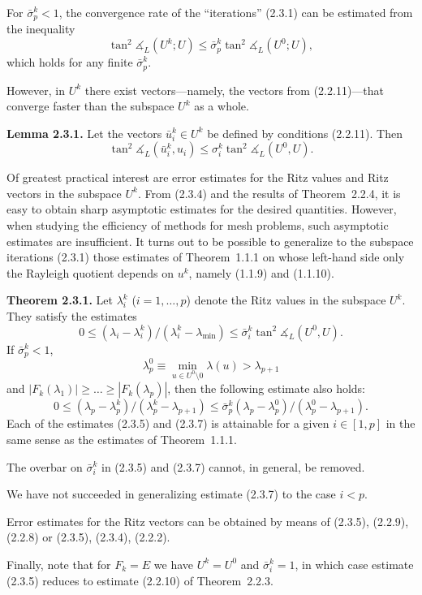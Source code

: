 \documentclass[11pt,oneside]{book}
\newcommand{\ang}{\measuredangle}
\begin{document}
For $\bar{\sigma}_p^k < 1$, the convergence rate of the ``iterations'' (2.3.1) can be estimated from the inequality
\[
\tan^2 \ang_L(U^k; U) \leqslant \bar{\sigma}_p^k \tan^2 \ang_L(U^0; U), \tag{2.3.3}
\]
which holds for any finite $\bar{\sigma}_p^k$.

However, in $U^k$ there exist vectors---namely, the vectors from (2.2.11)---that converge faster than the subspace $U^k$ as a whole.

\textbf{Lemma 2.3.1.} Let the vectors $\bar{u}_i^k \in U^k$ be defined by conditions (2.2.11). Then
\[
\tan^2 \ang_L(\bar{u}_i^k, u_i) \leqslant \sigma_i^k \tan^2 \ang_L(U^0, U). \tag{2.3.4}
\]

Of greatest practical interest are error estimates for the Ritz values and Ritz vectors in the subspace $U^k$. From (2.3.4) and the results of Theorem~2.2.4, it is easy to obtain sharp asymptotic estimates for the desired quantities. However, when studying the efficiency of methods for
mesh problems, such asymptotic estimates are insufficient. It turns out to be possible to generalize to the subspace iterations (2.3.1) those estimates of Theorem~1.1.1 on whose left-hand side only the Rayleigh quotient depends on $u^k$, namely (1.1.9) and (1.1.10).

\textbf{Theorem 2.3.1.} Let $\lambda_i^k$ ($i = 1, \ldots, p$) denote the Ritz values in the subspace $U^k$. They satisfy the estimates
\[
0 \leqslant (\lambda_i - \lambda_i^k) / (\lambda_i^k - \lambda_{\min}) \leqslant \bar{\sigma}_i^k \tan^2 \ang_L(U^0, U). \tag{2.3.5}
\]
If $\bar{\sigma}_p^k < 1$,
\[
\lambda_p^0 \equiv \min_{u \in U^0 \setminus 0} \lambda(u) > \lambda_{p+1} \tag{2.3.6}
\]
and $|F_k(\lambda_1)| \geqslant \ldots \geqslant |F_k(\lambda_p)|$, then the following estimate also holds:
\[
0 \leqslant (\lambda_p - \lambda_p^k) / (\lambda_p^k - \lambda_{p+1}) \leqslant \bar{\sigma}_p^k (\lambda_p - \lambda_p^0) / (\lambda_p^0 - \lambda_{p+1}). \tag{2.3.7}
\]
Each of the estimates (2.3.5) and (2.3.7) is attainable for a given $i \in [1, p]$ in the same sense as the estimates of Theorem~1.1.1.

The overbar on $\bar{\sigma}_i^k$ in (2.3.5) and (2.3.7) cannot, in general, be removed.

We have not succeeded in generalizing estimate (2.3.7) to the case $i < p$.

Error estimates for the Ritz vectors can be obtained by means of (2.3.5), (2.2.9), (2.2.8) or (2.3.5), (2.3.4), (2.2.2).

Finally, note that for $F_k = E$ we have $U^k = U^0$ and $\bar{\sigma}_i^k = 1$, in which case estimate (2.3.5) reduces to estimate (2.2.10) of Theorem~2.2.3.
\end{document}
